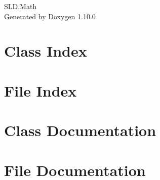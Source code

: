 \documentclass[twoside]{book}
\newcommand{\+}{\discretionary{\mbox{\scriptsize$\hookleftarrow$}}{}{}}
\newcommand{\clearemptydoublepage}{%
    \newpage{\pagestyle{empty}\cleardoublepage}%
  }
\begin{document}
  \raggedbottom
    \hypersetup{pageanchor=false,
                bookmarksnumbered=true,
                pdfencoding=unicode
               }
  \begin{titlepage}
  \vspace*{7cm}
  \begin{center}%
  {\Large SLD.\+Math}\\
  \vspace*{1cm}
  {\large Generated by Doxygen 1.10.0}\\
  \end{center}
  \end{titlepage}
  \clearemptydoublepage
  \tableofcontents
  \clearemptydoublepage
  \hypersetup{pageanchor=true}
\chapter{Class Index}

\chapter{File Index}

\chapter{Class Documentation}





\chapter{File Documentation}

  \backmatter
  \newpage
  \clearemptydoublepage
  \printindex
\end{document}

